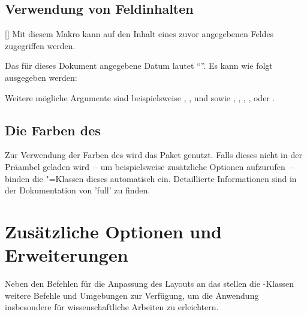 \begin{Declaration*}{}
\begin{Declaration*}{}
\begin{Declaration*}{}
\subsection{Verwendung von Feldinhalten}
%
\begin{Declaration}[v2.06]{[]}
\printdeclarationlist
Mit diesem Makro kann auf den Inhalt eines zuvor angegebenen Feldes zugegriffen 
werden.
\begin{Example}
Das für dieses Dokument angegebene Datum lautet \enquote{}. Es 
kann wie folgt ausgegeben werden:
\begin{Code}
\end{Code}
\end{Example}
Weitere mögliche Argumente sind beispielsweise , 
,  und  sowie ,
, , ,  oder
.
\end{Declaration}

\subsection{Die Farben des \CDs}
%
%
Zur Verwendung der Farben des \CDs wird das Paket  
genutzt. Falls dieses nicht in der Präambel geladen wird~-- um beispielsweise 
zusätzliche Optionen aufzurufen~-- binden die \TUDScript"=Klassen dieses 
automatisch ein. Detaillierte Informationen sind in der Dokumentation von 
'full' zu finden.
%



\section{Zusätzliche Optionen und Erweiterungen}
%
Neben den Befehlen für die Anpassung des Layouts an das \TUDCD stellen die 
\TUDScript-Klassen weitere Befehle und Umgebungen zur Verfügung, um die 
Anwendung insbesondere für wissenschaftliche Arbeiten zu erleichtern.



\end{Declaration*}
\end{Declaration*}
\end{Declaration*}
